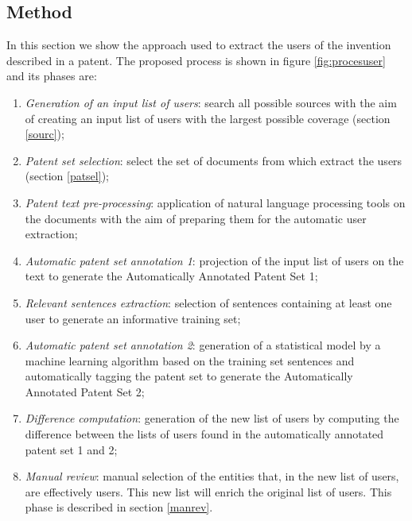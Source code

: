 \documentclass[]{book}
\begin{document}
\subsection{Method}\label{method}

In this section we show the approach used to extract the users of the
invention described in a patent. The proposed process is shown in figure
\ref{fig:procesuser} and its phases are:

\begin{enumerate}
\def\labelenumi{\arabic{enumi}.}
\item
  \emph{Generation of an input list of users}: search all possible
  sources with the aim of creating an input list of users with the
  largest possible coverage (section \ref{sourc});
\item
  \emph{Patent set selection}: select the set of documents from which
  extract the users (section \ref{patsel});
\item
  \emph{Patent text pre-processing}: application of natural language
  processing tools on the documents with the aim of preparing them for
  the automatic user extraction;
\item
  \emph{Automatic patent set annotation 1}: projection of the input list
  of users on the text to generate the Automatically Annotated Patent
  Set 1;
\item
  \emph{Relevant sentences extraction}: selection of sentences
  containing at least one user to generate an informative training set;
\item
  \emph{Automatic patent set annotation 2}: generation of a statistical
  model by a machine learning algorithm based on the training set
  sentences and automatically tagging the patent set to generate the
  Automatically Annotated Patent Set 2;
\item
  \emph{Difference computation}: generation of the new list of users by
  computing the difference between the lists of users found in the
  automatically annotated patent set 1 and 2;
\item
  \emph{Manual review}: manual selection of the entities that, in the
  new list of users, are effectively users. This new list will enrich
  the original list of users. This phase is described in section
  \ref{manrev}.
\end{enumerate}
\end{document}
